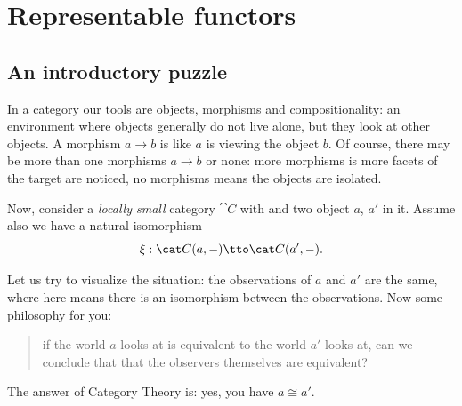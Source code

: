 
\chapter{Representable functors}

\section{An introductory puzzle}

In a category our tools are objects, morphisms and compositionality: an
environment where objects generally do not live alone, but they look at
other objects. A morphism \(a \to b\) is like \(a\) is viewing the object
\(b\). Of course, there may be more than one morphisms \(a \to b\) or
none: more morphisms is more facets of the target are noticed, no
morphisms means the objects are isolated.

Now, consider a {\em locally small} category \(\cat C\) with and two
object \(a\), \(a'\) in it. Assume also we have a natural isomorphism
\begin{equation}
  \xi : \cat C (a, -) \tto \cat C(a', -) . \label{equation:IsoOfLeftHoms}
\end{equation}

Let us try to visualize the situation: the observations of \(a\) and
\(a'\) are the same, where  here means there is an
isomorphism between the observations. Now some philosophy for you:
%
\begin{quotation}
  if the world \(a\) looks at is equivalent to the world \(a'\) looks
  at, can we conclude that that the observers themselves are equivalent?
\end{quotation}
%
The answer of Category Theory is: yes, you have \(a \cong a'\).

